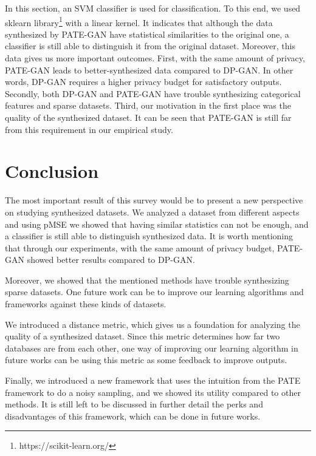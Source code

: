 \documentclass{article}
\begin{document}
In this section, an SVM classifier is used for classification. To this end, we used sklearn library\footnote{https://scikit-learn.org/} with a linear kernel. It indicates that although the data synthesized by PATE-GAN have statistical similarities to the original one, a classifier is still able to distinguish it from the original dataset. Moreover, this data gives us more important outcomes. First, with the same amount of privacy, PATE-GAN leads to better-synthesized data compared to DP-GAN. In other words, DP-GAN requires a higher privacy budget for satisfactory outputs. Secondly, both DP-GAN and PATE-GAN have trouble synthesizing categorical features and sparse datasets. Third, our motivation in the first place was the quality of the synthesized dataset. It can be seen that PATE-GAN is still far from this requirement in our empirical study. 


\section{Conclusion}
The most important result of this survey would be to present a new perspective on studying synthesized datasets. We analyzed a dataset from different aspects and using pMSE we showed that having similar statistics can not be enough, and a classifier is still able to distinguish synthesized data. It is worth mentioning that through our experiments, with the same amount of privacy budget, PATE-GAN showed better results compared to DP-GAN.

Moreover, we showed that the mentioned methods have trouble synthesizing sparse datasets. One future work can be to improve our learning algorithms and frameworks against these kinds of datasets.

We introduced a distance metric, which gives us a foundation for analyzing the quality of a synthesized dataset. Since this metric determines how far two databases are from each other, one way of improving our learning algorithm in future works can be using this metric as some feedback to improve outputs.

Finally, we introduced a new framework that uses the intuition from the PATE framework to do a noisy sampling, and we showed its utility compared to other methods. It is still left to be discussed in further detail the perks and disadvantages of this framework, which can be done in future works.
\newpage
\noindent

\end{document}

